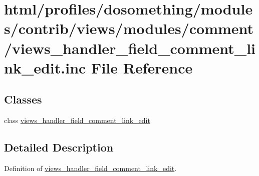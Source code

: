 \hypertarget{views__handler__field__comment__link__edit_8inc}{
\section{html/profiles/dosomething/modules/contrib/views/modules/comment/views\_\-handler\_\-field\_\-comment\_\-link\_\-edit.inc File Reference}
\label{views__handler__field__comment__link__edit_8inc}
}
\subsection*{Classes}
\begin{DoxyCompactItemize}
\item 
class \hyperlink{classviews__handler__field__comment__link__edit}{views\_\-handler\_\-field\_\-comment\_\-link\_\-edit}
\end{DoxyCompactItemize}


\subsection{Detailed Description}
Definition of \hyperlink{classviews__handler__field__comment__link__edit}{views\_\-handler\_\-field\_\-comment\_\-link\_\-edit}. 